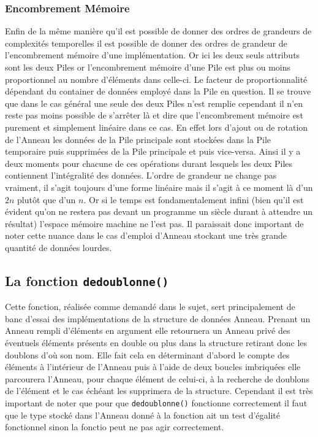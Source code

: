 \documentclass{article}
\newcommand{\info}{\texttt}
\begin{document}
        \subsubsection{Encombrement Mémoire}
        
        Enfin de la même manière qu'il est possible de donner des ordres de grandeurs de complexités temporelles il est possible de donner des ordres de grandeur de l'encombrement mémoire d'une implémentation. Or ici les deux seuls attributs sont les deux Piles or l'encombrement mémoire d'une Pile est plus ou moins proportionnel au nombre d'éléments dans celle-ci. Le facteur de proportionnalité dépendant du container de données employé dans la Pile en question. Il se trouve que dans le cas général une seule des deux Piles n'est remplie cependant il n'en reste pas moins possible de s'arrêter là et dire que l'encombrement mémoire est purement et simplement linéaire dans ce cas. En effet lors d'ajout ou de rotation de l'Anneau les données de la Pile principale sont stockées dans la Pile temporaire puis supprimées de la Pile principale et puis vice-versa. Ainsi il y a deux moments pour chacune de ces opérations durant lesquels les deux Piles contiennent l'intégralité des données. L'ordre de grandeur ne change pas vraiment, il s'agit toujours d'une forme linéaire mais il s'agit à ce moment là d'un $2n$ plutôt que d'un $n$. Or si le temps est fondamentalement infini (bien qu'il est évident qu'on ne restera pas devant un programme un siècle durant à attendre un résultat) l'espace mémoire machine ne l'est pas. Il paraissait donc important de noter cette nuance dans le cas d'emploi d'Anneau stockant une très grande quantité de données lourdes.
        
    \subsection{La fonction \info{dedoublonne()}}
    \label{dedoublonne}
    Cette fonction, réalisée comme demandé dans le sujet, sert principalement de banc d'essai des implémentations de la structure de données Anneau. Prenant un Anneau rempli d'éléments en argument elle retournera un Anneau privé des éventuels éléments présents en double ou plus dans la structure retirant donc les doublons d'où son nom. Elle fait cela en déterminant d'abord le compte des éléments à l'intérieur de l'Anneau puis à l'aide de deux boucles imbriquées elle parcourera l'Anneau, pour chaque élément de celui-ci, à la recherche de doublons de l'élément et le cas échéant les supprimera de la structure. Cependant il est très important de noter que pour que \info{dedoublonne()} fonctionne correctement il faut que le type stocké dans l'Anneau donné à la fonction ait un test d'égalité fonctionnel sinon la fonctio peut ne pas agir correctement.
        
\end{document}
